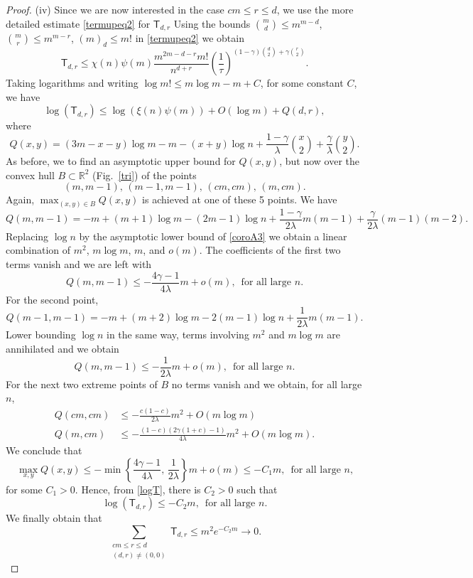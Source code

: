 \documentclass[reqno]{amsart}
\theoremstyle{theorem}
\theoremstyle{definition}
\theoremstyle{remark}
\def\R{\mathbb{R}}
\newcommand{\1}{{\text{\Large $\mathfrak 1$}}}	%
\numberwithin{equation}{section}
\def\TTT{\mathsf T}
\begin{document}
\begin{proof}
(iv)  
Since we are now interested in the case $cm \le r \le d$,
we use the more detailed estimate  \eqref{termupeq2}
for $\TTT_{d,r}$ 
Using the bounds $\binom{m}{d} \le m^{m-d}$, $\binom{m}{r} \le m^{m-r}$,
$(m)_d \le m!$ in \eqref{termupeq2} we obtain
\[
\TTT_{d, r} \le \chi(n) \psi (m)  \frac{m^{2m - d - r} m!}{n^{d + r}}
\left( \frac{1}{\tau} \right)^{(1-\gamma)\binom{d}{2} + \gamma \binom{r}{2}}.
\]
Taking logarithms and writing $\log m! \le m \log m -m + C$, for some constant $C$, we have
\begin{equation}
\label{logT}
\log (\TTT_{d, r}) \le \log(\xi(n) \psi(m)) + O(\log m) + Q(d, r),
\end{equation}
where
\[
Q(x, y) = (3m - x - y) \log m 
- m - (x + y) \log n  + \frac{1 - \gamma}{\lambda} \binom{x}{2} 
+ \frac{\gamma}{\lambda} \binom{y}{2}.
\]
As before, we to find an asymptotic upper bound for
$Q(x,y)$, but now over the convex hull $B\subset \R^2$  
(Fig.\ \ref{tri}) of the points 
\[
\text{$(m,m-1)$, $(m-1, m-1)$, $(cm, cm)$, $(m, cm)$}.
\]
Again, $\max_{(x,y) \in B} Q(x,y)$ is achieved at one
of these 5 points.
We have
\[
Q(m, m-1) = -m + (m + 1) \log m - (2m - 1) \log n
+ \frac{1-\gamma}{2\lambda}m(m-1) + \frac{\gamma}{2\lambda} (m-1)(m-2).
\]
Replacing $\log n$ by the asymptotic lower bound of \ref{coroA3}
we obtain a linear combination of $m^2$, $m \log m$, $m$, and $o(m)$.
The coefficients of the first two terms vanish and we are left with
\[
Q(m,m-1) \le - {\frac{4 \gamma - 1}{4 \lambda} m} +o(m),\,
\text{ for all large $n$}.
\]
For the second point,
\[
Q(m-1, m-1)  = - m + (m + 2) \log m  - 2 (m - 1) \log n 
+ \frac{1}{2\lambda} m(m-1).
\]
Lower bounding $\log n$ in the same way, terms involving $m^2$ and $m\log m$
are annihilated and we obtain
\[
Q(m,m-1) \le {-\frac{1}{2 \lambda} m} + o(m),\,
\text{ for all large $n$}.
\]
For the next  two extreme points of $B$ no terms vanish and we obtain,
for all large $n$,
\begin{align*}
Q(cm, cm)  %
&\le - {\frac{c(1-c)}{2 \lambda} m^2} + O(m \log m)
\\
Q(m, cm) 
&\le -{\frac{(1 - c) ( 2\gamma (1+c) - 1)}{4 \lambda} m^2}+O(m \log m).
\end{align*}
We conclude that
\[
\max_{x,y} Q(x,y) 
\le - \min\left\{\frac{4 \gamma - 1}{4 \lambda},\,\frac{1}{2\lambda}\right\} m
+o(m) \le - C_1 m,
\, \text{ for all large $n$,}
\]
for some $C_1>0$. Hence, from \eqref{logT}, there is $C_2>0$  such that
\[
\log(\TTT_{d,r}) \le - C_2 m, \, \text{ for all large $n$.}
\]
We finally obtain that
\[
\sum_{\substack{cm\le r\le d\\(d,r)\neq(0,0)}} \TTT_{d,r} 
\le m^2  e^{-C_2 m} \to 0.
\]


\end{proof}
\end{document}
